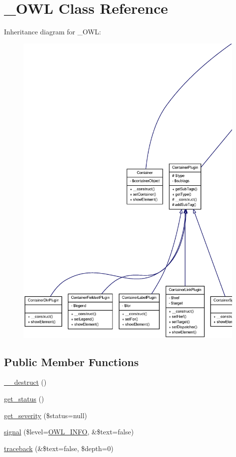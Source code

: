 \section{\_\-OWL Class Reference}
\label{class__OWL}


Inheritance diagram for \_\-OWL:
\nopagebreak
\begin{figure}[H]
\begin{center}
\leavevmode
\includegraphics[width=400pt]{class__OWL__inherit__graph}
\end{center}
\end{figure}
\subsection*{Public Member Functions}
\begin{DoxyCompactItemize}
\item 
\hyperlink{class__OWL_a44fd2222476a3109286cc82d92b6bbcc}{\_\-\_\-destruct} ()
\item 
\hyperlink{class__OWL_a99ec771fa2c5c279f80152cc09e489a8}{get\_\-status} ()
\item 
\hyperlink{class__OWL_adf9509ef96858be7bdd9414c5ef129aa}{get\_\-severity} (\$status=null)
\item 
\hyperlink{class__OWL_a51ba4a16409acf2a2f61f286939091a5}{signal} (\$level=\hyperlink{owl_8severitycodes_8php_a139328861128689f2f4def6a399d9057}{OWL\_\-INFO}, \&\$text=false)
\item 
\hyperlink{class__OWL_aa29547995d6741b7d2b90c1d4ea99a13}{traceback} (\&\$text=false, \$depth=0)
\end{DoxyCompactItemize}
